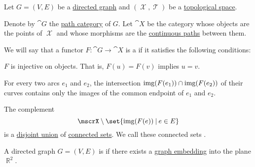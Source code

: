 \begin{definition}\label{def:graph_embedding}
  Let \( G = (V, E) \) be a \hyperref[def:graph/directed]{directed graph} and \( (\mscrX, \mscrT) \) be a \hyperref[def:topological_space]{topological space}.

  Denote by \( \cat{G} \) the \hyperref[def:path_category]{path category} of \( G \). Let \( \cat{X} \) be the category whose objects are the points of \( \mscrX \) and whose morphisms are the \hyperref[def:parametric_curve]{continuous paths} between them.

  We will say that a functor \( F: \cat{G} \to \cat{X} \) is a  if it satisfies the following conditions:
  \begin{thmenum}
     \( F \) is injective on objects. That is, \( F(u) = F(v) \) implies \( u = v \).

     For every two arcs \( e_1 \) and \( e_2 \), the intersection \( \operatorname{img}(F(e_1)) \cap \operatorname{img}(F(e_2)) \) of their curves contains only the images of the common endpoint of \( e_1 \) and \( e_2 \).

     The complement
    \begin{equation*}
      \mscrX \setminus \set{ \img(F(e)) \given e \in E }
    \end{equation*}
    is a \hyperref[def:disjoint_union]{disjoint union} of \hyperref[def:connected_space]{connected sets}. We call these connected sets .
  \end{thmenum}
\end{definition}

\begin{definition}\label{def:planar_graph}
  A directed graph \( G = (V, E) \) is  if there exists a \hyperref[def:graph_embedding]{graph embedding} into the plane \( \BbbR^2 \).
\end{definition}
